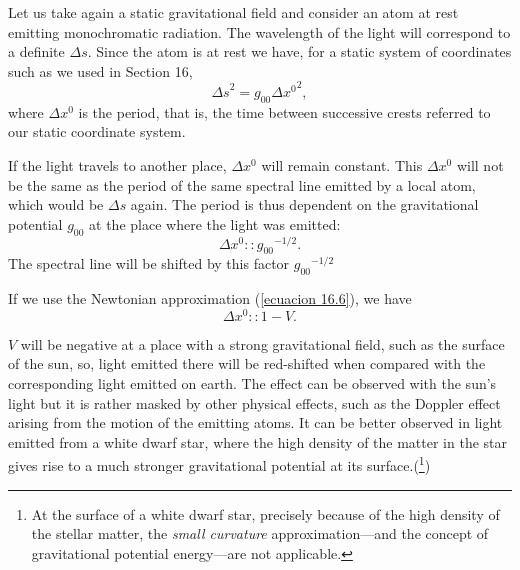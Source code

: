 Let us take again a static gravitational field and consider an atom at rest emitting monochromatic radiation. The 
wavelength of the light will correspond to a definite $\Delta s$. Since the atom is at rest we have, for a static 
system of coordinates such as we used in Section 16,
\[
    {\Delta s}^2 = g_{00}{\Delta x^0}^2,
\]
where $\Delta x^0$ is the period, that is, the time between successive crests referred to our static coordinate system.

If the light travels to another place, $\Delta x^0$ will remain constant. This $\Delta x^0$ will not be the same as the 
period of the same spectral line emitted by a local atom, which would be $\Delta s$ again. The period is thus dependent 
on the gravitational potential $g_{00}$ at the place where the light was emitted:
\[
    \Delta x^0 :: {g_{00}}^{-1/2}.
\]
The spectral line will be shifted by this factor ${g_{00}}^{-1/2}$

If we use the Newtonian approximation (\ref{ecuacion 16.6}), we have 
\[
    \Delta x^0 :: 1 - V.
\]

$V$ will be negative at a place with a strong gravitational field, such as the surface of the sun, so, light emitted 
there will be red-shifted when compared with the corresponding light emitted on earth. The effect can be observed with 
the sun's light but it is rather masked by other physical effects, such as the Doppler effect arising from the motion 
of the emitting atoms. It can be better observed in light emitted from a white dwarf star, where the high density of 
the matter in the star gives rise to a much stronger gravitational potential at its surface.(\footnote{At the surface 
of a white dwarf star, precisely because of the high density of the stellar matter, the \emph{small curvature} 
approximation---and the concept of gravitational potential energy---are not applicable.}) 
